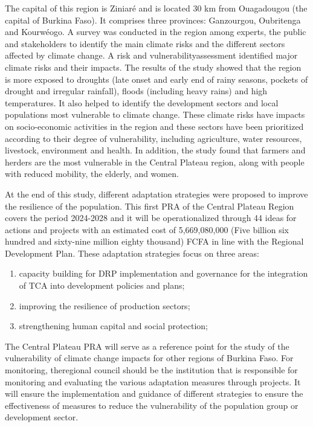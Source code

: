 \documentclass[
]{book}
\begin{document}
The capital of this region is Ziniaré and is located 30 km from Ouagadougou (the capital of Burkina Faso). It comprises three provinces: Ganzourgou, Oubritenga and Kourwéogo. A survey was conducted in the region among experts, the public and stakeholders to identify the main climate risks and the different sectors affected by climate change. A risk and vulnerabilityassessment identified major climate risks and their impacts. The results of the study showed that the region is more exposed to droughts (late onset and early end of rainy seasons, pockets of drought and irregular rainfall), floods (including heavy rains) and high temperatures. It also helped to identify the development sectors and local populations most vulnerable to climate change. These climate risks have impacts on socio-economic activities in the region and these sectors have been prioritized according to their degree of vulnerability, including agriculture, water resources, livestock, environment and health. In addition, the study found that farmers and herders are the most vulnerable in the Central Plateau region, along with people with reduced mobility, the elderly, and women.

At the end of this study, different adaptation strategies were proposed to improve the resilience of the population. This first PRA of the Central Plateau Region covers the period 2024-2028 and it will be operationalized through 44 ideas for actions and projects with an estimated cost of 5,669,080,000 (Five billion six hundred and sixty-nine million eighty thousand) FCFA in line with the Regional Development Plan. These adaptation strategies focus on three areas:

\begin{enumerate}
\def\labelenumi{\arabic{enumi}.}
\item
  capacity building for DRP implementation and governance for the integration of TCA into development policies and plans;
\item
  improving the resilience of production sectors;
\item
  strengthening human capital and social protection;
\end{enumerate}

The Central Plateau PRA will serve as a reference point for the study of the vulnerability of climate change impacts for other regions of Burkina Faso. For monitoring, theregional council should be the institution that is responsible for monitoring and evaluating the various adaptation measures through projects. It will ensure the implementation and guidance of different strategies to ensure the effectiveness of measures to reduce the vulnerability of the population group or development sector.
\end{document}
